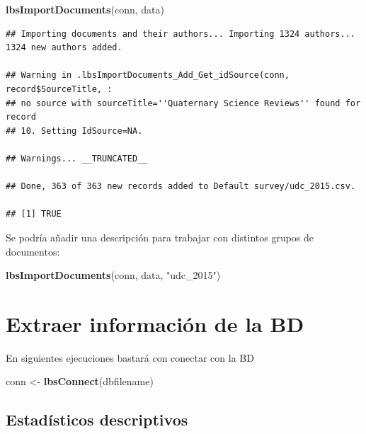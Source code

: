 \documentclass[
]{book}
\newenvironment{Shaded}{\begin{snugshade}}{\end{snugshade}}
\newcommand{\FunctionTok}[1]{\textcolor[rgb]{0.13,0.29,0.53}{\textbf{#1}}}
\newcommand{\NormalTok}[1]{#1}
\newcommand{\OtherTok}[1]{\textcolor[rgb]{0.56,0.35,0.01}{#1}}
\newcommand{\StringTok}[1]{\textcolor[rgb]{0.31,0.60,0.02}{#1}}
\begin{document}
\begin{Shaded}
\begin{Highlighting}[]
\FunctionTok{lbsImportDocuments}\NormalTok{(conn, data) }
\end{Highlighting}
\end{Shaded}

\begin{verbatim}
## Importing documents and their authors... Importing 1324 authors... 1324 new authors added.

## Warning in .lbsImportDocuments_Add_Get_idSource(conn, record$SourceTitle, :
## no source with sourceTitle=''Quaternary Science Reviews'' found for record
## 10. Setting IdSource=NA.

## Warnings... __TRUNCATED__

## Done, 363 of 363 new records added to Default survey/udc_2015.csv.

## [1] TRUE
\end{verbatim}

Se podría añadir una descripción para trabajar con distintos grupos de documentos:

\begin{Shaded}
\begin{Highlighting}[]
\FunctionTok{lbsImportDocuments}\NormalTok{(conn, data, }\StringTok{"udc\_2015"}\NormalTok{) }
\end{Highlighting}
\end{Shaded}

\hypertarget{extraer-informaciuxf3n-de-la-bd}{%
\section{Extraer información de la BD}\label{extraer-informaciuxf3n-de-la-bd}}

En siguientes ejecuciones bastará con conectar con la BD

\begin{Shaded}
\begin{Highlighting}[]
\NormalTok{conn }\OtherTok{\textless{}{-}} \FunctionTok{lbsConnect}\NormalTok{(dbfilename)}
\end{Highlighting}
\end{Shaded}

\hypertarget{estaduxedsticos-descriptivos}{%
\subsection{Estadísticos descriptivos}\label{estaduxedsticos-descriptivos}}
\end{document}
